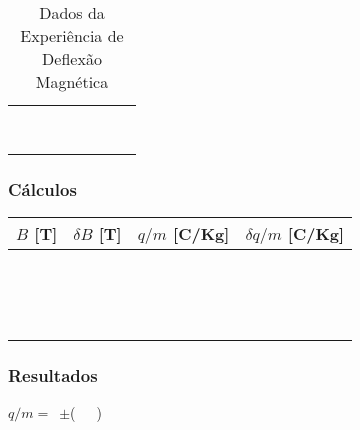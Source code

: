 \documentclass[a4paper,12pt]{article}  %
\begin{document}
\begin{table}[!hbp]
\begin{tabular}{|c|c|c|c|c|c|c|c|}
	 &  &  &  & &  & & \\ \cline{5-6}
	 &  &  &  & &  & & \\ \cline{5-6}
	 \hline
	 &  &  &  & &  & & \\ \cline{5-6}
	 &  &  &  & &  & & \\ \cline{5-6}
	 &  &  &  & &  & & \\ \cline{5-6}
	 \hline
	 &  &  &  & &  & & \\ \cline{5-6}
	 &  &  &  & &  & & \\ \cline{5-6}
	 &  &  &  & &  & & \\ \cline{5-6}
	 \hline
 	\end{tabular}	 	
	\caption{Dados da Experiência de Deflexão Magnética} 
	\label{tab:Dados}
\end{table}


\subsubsection{\sf Cálculos}

\begin{center}
	\begin{tabular}{|c|c|c|c|}
	\hline
	$B$ [T] & $\delta B$  [T] & $q/m$ [C/Kg] & $\delta q/m$ [C/Kg] \\
	\hline
	 &  &  &  \\
	\hline
	 &  &  &  \\
	\hline
	 &  &  &  \\
	\hline
	 &  &  &  \\
	\hline
	 &  &  &  \\
	 \hline \hline
	\hline
	 &  &  &  \\
	\hline
	 &  &  &  \\
	\hline
	 &  &  &  \\
	\hline
	 &  &  &  \\
	\hline
	 &  &  &  \\
	 \hline \hline
	\hline
	 &  &  &  \\
	\hline
	 &  &  &  \\
	\hline
	 &  &  &  \\
	\hline
	 &  &  &  \\
	\hline
	 &  &  &  \\
	 \hline 
 	\end{tabular}
\end{center}


\subsubsection{\sf Resultados}
\noindent  $q/m =$~\underline{\makebox[1.5cm][r]{~}}$\pm$\underline{\makebox[1cm][r]{~}}(~~~)\\  
\end{document}
